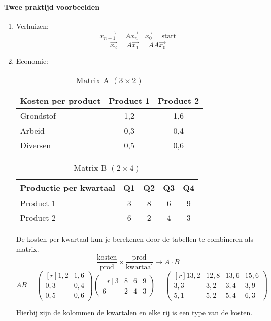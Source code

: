 \paragraph{Twee praktijd voorbeelden}
\begin{enumerate}
\item Verhuizen:
	\[ \vec{x_{n+1}} = A \vec{x_n} \quad \vec{x_0} = \mbox{start} \]
	\[ \vec{x_2} = A \vec{x_1} = AA \vec{x_0} \]
\item Economie:
\begin{table}[h!]
	\begin{tabular}{l|cc}
		Kosten per product & Product 1 &  Product 2 \\
		\hline
		Grondstof & 1,2 & 1,6 \\
		Arbeid & 0,3 & 0,4 \\
		Diversen & 0,5 & 0,6
	\end{tabular}
	\caption{Matrix A $(3 \times 2)$}
\end{table}

\begin{table}[h!]
	\begin{tabular}{l|cccc}
		Productie per kwartaal & Q1 & Q2 & Q3 & Q4 \\
		\hline
		Product 1 & 3 & 8 & 6 & 9 \\
		Product 2 & 6 & 2 & 4 & 3
	\end{tabular}
	\caption{Matrix B $(2 \times 4)$}
\end{table}

De kosten per kwartaal kun je berekenen door de tabellen te combineren als matrix.
\[ \frac{\mbox{kosten}}{\mbox{prod}} \times \frac{\mbox{prod}}{\mbox{kwartaal}} \to A \cdot B \]
\[ AB = \begin{pmatrix*}[r] 1,2 & 1,6 \\ 0,3 & 0,4 \\ 0,5 & 0,6 \end{pmatrix*} \begin{pmatrix*}[r] 3 & 8 & 6 & 9 \\ 6 & 2 & 4 & 3 \end{pmatrix*} = \begin{pmatrix*}[r]
	13,2 & 12,8 & 13,6 & 15,6 \\
	3,3 & 3,2 & 3,4 & 3,9 \\
	5,1 & 5,2 & 5,4 & 6,3
\end{pmatrix*} \]

Hierbij zijn de kolommen de kwartalen en elke rij is een type van de kosten.

\end{enumerate}

